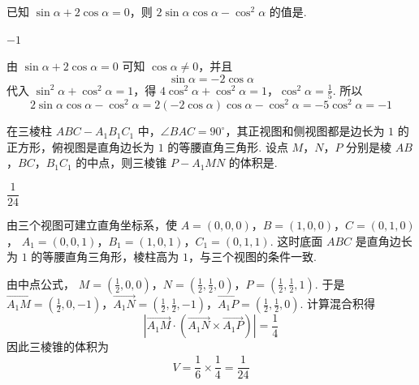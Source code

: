 \begin{problem}
已知 \(\sin \alpha + 2\cos \alpha = 0\)，则 \(2\sin \alpha \cos \alpha - \cos^2 \alpha\) 的值是\fillinblank{}.
\end{problem}

\begin{answer}
\(-1\)
\end{answer}

\begin{solution}
由 \(\sin\alpha+2\cos\alpha=0\) 可知 \(\cos\alpha\neq0\)，并且
\[
\sin\alpha=-2\cos\alpha
\]
代入 \(\sin^2\alpha+\cos^2\alpha=1\)，得
\(4\cos^2\alpha+\cos^2\alpha=1\)，\(\cos^2\alpha=\frac15\).
所以
\[
2\sin\alpha\cos\alpha-\cos^2\alpha
=2(-2\cos\alpha)\cos\alpha-\cos^2\alpha
=-5\cos^2\alpha=-1
\]
\end{solution}

\begin{problem}
在三棱柱 \(ABC - A_{1}B_{1}C_{1}\) 中，\(\angle BAC = 90^{\circ}\)，其正视图和侧视图都是边长为 \(1\) 的正方形，俯视图是直角边长为 \(1\) 的等腰直角三角形. 设点 \(M\)，\(N\)，\(P\) 分别是棱 \(AB\)，\(BC\)，\(B_{1}C_{1}\) 的中点，则三棱锥 \(P - A_{1}MN\) 的体积是\fillinblank{}.
\end{problem}

\begin{answer}
\(\dfrac{1}{24}\)
\end{answer}

\begin{solution}
由三个视图可建立直角坐标系，使
\(A=(0,0,0)\)，\(B=(1,0,0)\)，\(C=(0,1,0)\)，
\(A_1=(0,0,1)\)，\(B_1=(1,0,1)\)，\(C_1=(0,1,1)\).
这时底面 \(ABC\) 是直角边长为 \(1\) 的等腰直角三角形，棱柱高为 \(1\)，与三个视图的条件一致.

由中点公式，
\(M=\left(\frac12,0,0\right)\)，\(N=\left(\frac12,\frac12,0\right)\)，\(P=\left(\frac12,\frac12,1\right)\).
于是
\(\overrightarrow{A_1M}=\left(\frac12,0,-1\right)\)，\(\overrightarrow{A_1N}=\left(\frac12,\frac12,-1\right)\)，\(\overrightarrow{A_1P}=\left(\frac12,\frac12,0\right)\).
计算混合积得
\[
\left|\overrightarrow{A_1M}\cdot
\left(\overrightarrow{A_1N}\times\overrightarrow{A_1P}\right)\right|=\frac14
\]
因此三棱锥的体积为
\[
V=\frac16\times\frac14=\frac1{24}
\]
\end{solution}

